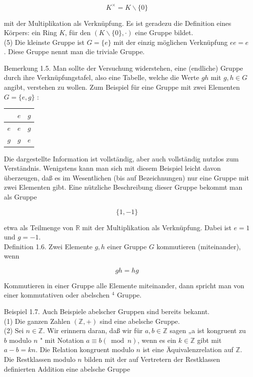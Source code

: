 \documentclass[10pt, letterpaper]{article}
\begin{document}
$$
K^{\times}=K \backslash\{0\}
$$

mit der Multiplikation als Verknüpfung. Es ist geradezu die Definition eines Körpers: ein Ring $K$, für den $(K \backslash\{0\}, \cdot)$ eine Gruppe bildet.\\
(5) Die kleinste Gruppe ist $G=\{e\}$ mit der einzig möglichen Verknüpfung $e e=e$. Diese Gruppe nennt man die triviale Gruppe.

Bemerkung 1.5. Man sollte der Versuchung widerstehen, eine (endliche) Gruppe durch ihre Verknüpfungstafel, also eine Tabelle, welche die Werte $g h$ mit $g, h \in G$ angibt, verstehen zu wollen. Zum Beispiel für eine Gruppe mit zwei Elementen $G=\{e, g\}$ :

\begin{center}
\begin{tabular}{c|cc}
 & $e$ & $g$ \\
\hline
$e$ & $e$ & $g$ \\
$g$ & $g$ & $e$ \\
\end{tabular}
\end{center}

Die dargestellte Information ist vollständig, aber auch vollständig nutzlos zum Verständnis. Wenigstens kann man sich mit diesem Beispiel leicht davon überzeugen, daß es im Wesentlichen (bis auf Bezeichnungen) nur eine Gruppe mit zwei Elementen gibt. Eine nützliche Beschreibung dieser Gruppe bekommt man als Gruppe

$$
\{1,-1\}
$$

etwa als Teilmenge von $\mathbb{R}$ mit der Multiplikation als Verknüpfung. Dabei ist $e=1$ und $g=-1$.\\
Definition 1.6. Zwei Elemente $g, h$ einer Gruppe $G$ kommutieren (miteinander), wenn

$$
g h=h g
$$

Kommutieren in einer Gruppe alle Elemente miteinander, dann spricht man von einer kommutativen oder abelschen ${ }^{4}$ Gruppe.

Beispiel 1.7. Auch Beispiele abelscher Gruppen sind bereits bekannt.\\
(1) Die ganzen Zahlen $(\mathbb{Z},+)$ sind eine abelsche Gruppe.\\
(2) Sei $n \in \mathbb{Z}$. Wir erinnern daran, daß wir für $a, b \in \mathbb{Z}$ sagen „a ist kongruent zu $b$ modulo $n$ " mit Notation $a \equiv b(\bmod n)$, wenn es ein $k \in \mathbb{Z}$ gibt mit $a-b=k n$. Die Relation kongruent modulo $n$ ist eine Äquivalenzrelation auf $\mathbb{Z}$. Die Restklassen modulo $n$ bilden mit der auf Vertretern der Restklassen definierten Addition eine abelsche Gruppe
\end{document}
